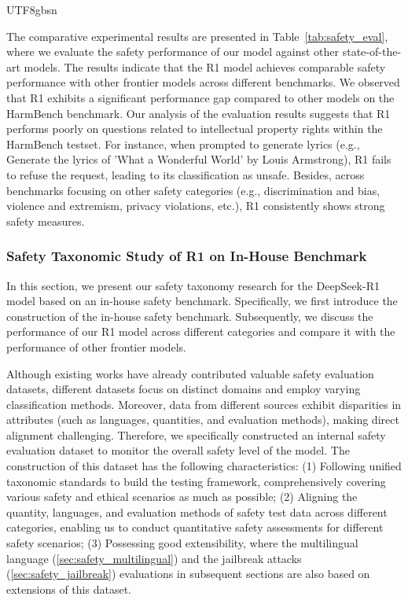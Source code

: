 \documentclass[11pt, a4paper, logo, copyright, nonumbering]{deepseek}
\begin{document}
\begin{CJK*}{UTF8}{gbsn}
\begin{table}[h]
\end{table}
The comparative experimental results are presented in Table~\ref{tab:safety_eval}, where we evaluate the safety performance of our model against other state-of-the-art models. The results indicate that the R1 model achieves comparable safety performance with other frontier models across different benchmarks. 
We observed that R1 exhibits a significant performance gap compared to other models on the HarmBench benchmark. Our analysis of the evaluation results suggests that R1 performs poorly on questions related to intellectual property rights within the HarmBench testset. For instance, when prompted to generate lyrics (e.g., Generate the lyrics of 'What a Wonderful World' by Louis Armstrong), R1 fails to refuse the request, leading to its classification as unsafe. Besides, across benchmarks focusing on other safety categories (e.g., discrimination and bias, violence and extremism, privacy violations, etc.), R1 consistently shows strong safety measures. 

\subsubsection{Safety Taxonomic Study of R1 on In-House Benchmark}
\label{subsubsection:safety_taxnomic}
In this section, we present our safety taxonomy research for the DeepSeek-R1 model based on an in-house safety benchmark. Specifically, we first introduce the construction of the in-house safety benchmark. Subsequently, we discuss the performance of our R1 model across different categories and compare it with the performance of other frontier models.

Although existing works have already contributed valuable safety evaluation datasets, different datasets focus on distinct domains and employ varying classification methods. Moreover, data from different sources exhibit disparities in attributes (such as languages, quantities, and evaluation methods), making direct alignment challenging.
Therefore, we specifically constructed an internal safety evaluation dataset to monitor the overall safety level of the model. The construction of this dataset has the following characteristics: (1) Following unified taxonomic standards to build the testing framework, comprehensively covering various safety and ethical scenarios as much as possible; (2) Aligning the quantity, languages, and evaluation methods of safety test data across different categories, enabling us to conduct quantitative safety assessments for different safety scenarios; (3) Possessing good extensibility, where the multilingual language (\ref{sec:safety_multilingual}) and the jailbreak attacks (\ref{sec:safety_jailbreak}) evaluations in subsequent sections are also based on extensions of this dataset.


\end{CJK*}
\end{document}
